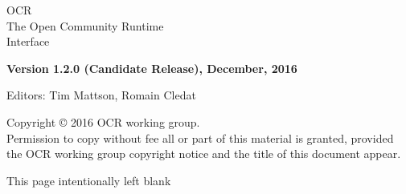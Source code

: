 
\begin{titlepage}

  \begin{adjustwidth}{-0.75in}{0in}
    \begin{center}
      \Huge
      \textsf{OCR\\The Open Community Runtime \\Interface}

      \vspace{0.5in}\textsf{ }\vspace{-0.7in}
      \normalsize
      \vspace{1.0in}
      \textbf{Version 1.2.0 (Candidate Release), December, 2016}
      \vspace{1.0in}

Editors: Tim Mattson, Romain Cledat
    \end{center}
  \end{adjustwidth}
  \vspace{2.0in}

  \begin{adjustwidth}{0pt}{1em}\setlength{\parskip}{0.25\baselineskip}%
Copyright © 2016 OCR working group.\\
Permission to copy without fee all or part of this material is granted,
provided the OCR working group copyright notice and
the title of this document appear.
  \end{adjustwidth}
\end{titlepage}


\clearpage
\thispagestyle{empty}
\phantom{a}
This page intentionally left blank
\vfill
